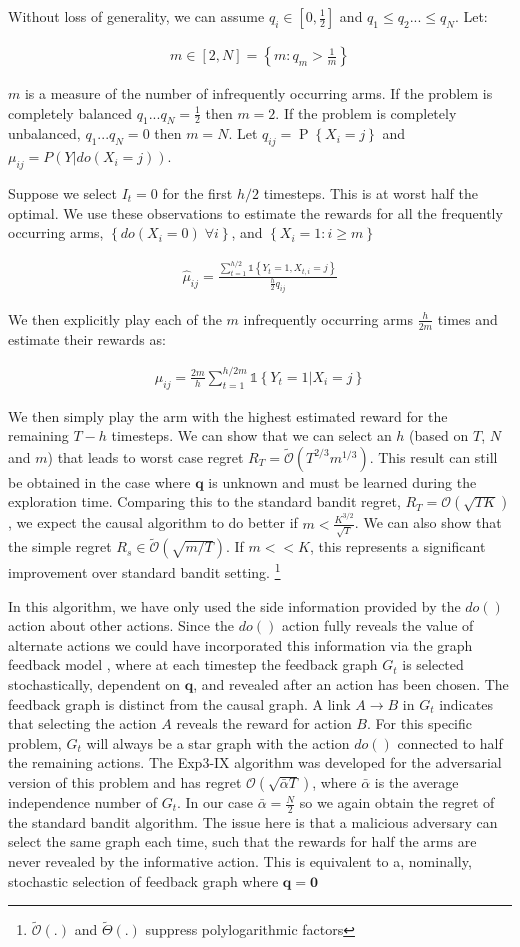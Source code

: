\documentclass[11pt,a4paper]{article}
\newcommand{\set}[1]{\left\{#1\right\}}
\newcommand{\ind}[1]{\mathds{1}\!\!\set{#1}}
\newcommand{\eqn}[1]{\begin{align}#1\end{align}}
\newcommand{\bigo}[1]{\mathcal{O}\left( #1 \right)}
\newcommand{\bigotilde}[1]{\tilde{\mathcal{O}}\left( #1 \right)}
\newcommand{\bigthetatilde}[1]{\tilde{\Theta}\left( #1 \right)}
\renewcommand{\P}[1]{\operatorname{P}\left\{#1\right\}}
\begin{document}
Without loss of generality, we can assume $q_i \in [0,\frac{1}{2}]$ and $q_1 \leq q_2 ... \leq q_N$. Let:

\eqn {
m \in [2,N] = \set{m:q_m > \frac{1}{m}}
}

$m$ is a measure of the number of infrequently occurring arms. If the problem is completely balanced $q_1...q_N = \frac{1}{2}$ then $m = 2$. If the problem is completely unbalanced, $q_1...q_N = 0$ then $m=N$.  Let $q_{ij} = \P{X_i = j}$ and $\mu_{ij} = P(Y|do(X_i = j))$.


Suppose we select $I_t = 0$ for the first $h/2$ timesteps. This is at worst half the optimal. We use these observations to estimate the rewards for all the frequently occurring arms, $\set{do(X_i = 0) \; \forall i}$, and $\set{X_i = 1:i \geq m}$ 

\eqn {
\hat{\mu}_{ij} = \frac{\sum_{t=1}^{h/2}\ind{Y_t=1,X_{t,i}=j}}{\frac{h}{2}q_{ij}}
}

We then explicitly play each of the $m$ infrequently occurring arms $\frac{h}{2m}$ times and estimate their rewards as:

\eqn {
\hat{\mu}_{ij} = \frac{2m}{h}\sum_{t = 1}^{h/2m}\ind{Y_t = 1|X_i=j}
}

We then simply play the arm with the highest estimated reward for the remaining $T-h$ timesteps. We can show that we can select an $h$ (based on $T$, $N$ and $m$) that leads to worst case regret $R_T = \bigotilde{T^{2/3}m^{1/3}}$. This result can still be obtained in the case where $\boldsymbol{q}$ is unknown and must be learned during the exploration time. Comparing this to the standard bandit regret, $R_T = \bigo{\sqrt{TK}}$, we expect the causal algorithm to do better if $m < \frac{K^{3/2}}{\sqrt{T}}$. We can also show that the simple regret $R_s \in \bigotilde{\sqrt{m/T}}$. If $m << K$, this represents a significant improvement over standard bandit setting. \footnote{ $\bigotilde{.}$ and $\bigthetatilde{.}$ suppress polylogarithmic factors}


In this algorithm, we have only used the side information provided by the $do()$ action about other actions. Since the $do()$ action fully reveals the value of alternate actions we could have incorporated this information via the graph feedback model \cite{Mannor2011}, where at each timestep the feedback graph $G_t$ is selected stochastically, dependent on $\boldsymbol{q}$, and revealed after an action has been chosen. The feedback graph is distinct from the causal graph. A link $A \rightarrow B$ in $G_t$ indicates that selecting the action $A$ reveals the reward for action $B$. For this specific problem, $G_t$ will always be a star graph with the action $do()$ connected to half the remaining actions. The Exp3-IX algorithm \cite{Kocak2014} was developed for the adversarial version of this problem and has regret $\bigo{\sqrt{\bar{\alpha}T}}$, where $\bar{\alpha}$ is the average independence number of $G_t$. In our case $\bar{\alpha} = \frac{N}{2}$ so we again obtain the regret of the standard bandit algorithm. The issue here is that a malicious adversary can select the same graph each time, such that the rewards for half the arms are never revealed by the informative action. This is equivalent to a, nominally, stochastic selection of feedback graph where $\boldsymbol{q} = \boldsymbol{0}$
\end{document}
